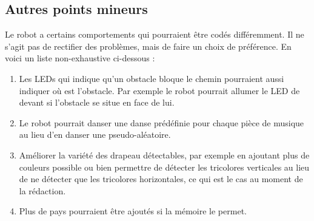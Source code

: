 \documentclass{article}
\begin{document}
    \subsection{Autres points mineurs}
    Le robot a certains comportements qui pourraient être codés différemment.
    Il ne s'agit pas de rectifier des problèmes, mais de faire un choix de préférence.
    En voici un liste non-exhaustive ci-dessous : 
    \begin{enumerate}
        \item Les LEDs qui indique qu'un obstacle bloque le chemin pourraient aussi indiquer où est l'obstacle.
        Par exemple le robot pourrait allumer le LED de devant si l'obstacle se situe en face de lui.
        \item Le robot pourrait danser une danse prédéfinie pour chaque pièce de musique au lieu d'en danser une pseudo-aléatoire.
        \item Améliorer la variété des drapeau détectables, par exemple en ajoutant plus de couleurs possible ou bien permettre de détecter les tricolores verticales au lieu de ne détecter que les tricolores horizontales, ce qui est le cas au moment de la rédaction.
        \item Plus de pays pourraient être ajoutés si la mémoire le permet.
    \end{enumerate}
    
    
\end{document}
